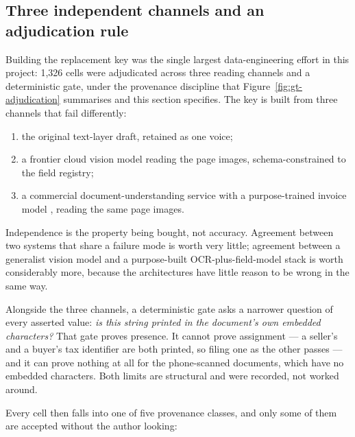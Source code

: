\subsection{Three independent channels and an adjudication rule}

Building the replacement key was the single largest data-engineering effort in this
project: 1{,}326 cells were adjudicated across three reading channels and a
deterministic gate, under the provenance discipline that Figure~\ref{fig:gt-adjudication}
summarises and this section specifies. The key is built from three channels that fail
differently:

\begin{enumerate}
  \item the original text-layer draft, retained as one voice;
  \item a frontier cloud vision model reading the page images, schema-constrained to the
        field registry;
  \item a commercial document-understanding service with a purpose-trained invoice model
        \parencite{azuredocintelligence}, reading the same page images.
\end{enumerate}

Independence is the property being bought, not accuracy. Agreement between two systems that
share a failure mode is worth very little; agreement between a generalist vision model and a
purpose-built \ac{OCR}-plus-field-model stack is worth considerably more, because the
architectures have little reason to be wrong in the same way.

Alongside the three channels, a deterministic gate asks a narrower question of every asserted
value: \emph{is this string printed in the document's own embedded characters?} That gate
proves presence. It cannot prove assignment --- a seller's and a buyer's tax identifier are
both printed, so filing one as the other passes --- and it can prove nothing at all for the
phone-scanned documents, which have no embedded characters. Both limits are structural and were
recorded, not worked around.

Every cell then falls into one of five provenance classes, and only some of them are accepted
without the author looking:


